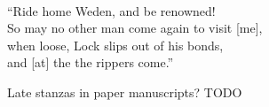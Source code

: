  \\
“Ride home Weden, and be renowned! \\
So may no other man come again to visit [me], \\
when loose, Lock slips out of his bonds,\\
and [at] the  the rippers come.”\evb
\evg


Late stanzas in paper manuscripts? TODO
